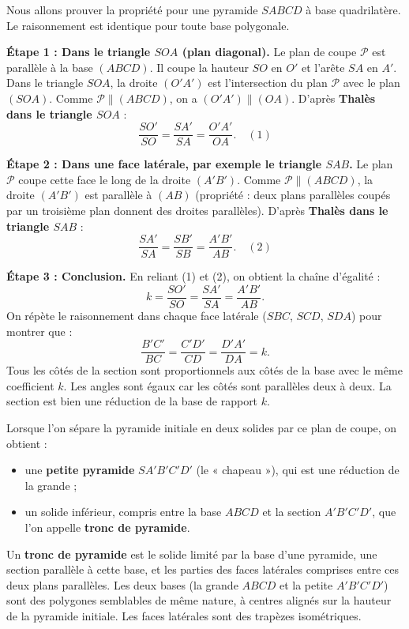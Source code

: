 \documentclass[11pt]{article}
\newcounter{popsec}
\newcounter{popsub}
\newcommand{\courssub}[1]{%
  \stepcounter{popsub}%
  \par\vspace{9pt}\noindent{\popxbold\fontsize{11.5}{13}\selectfont\color{popink}{\color{poporange}\thepopsec.\thepopsub}\hspace{6pt}#1}\par\nopagebreak\vspace{4pt}
}
\begin{document}
\begin{experience}
Nous allons prouver la propriété pour une pyramide $SABCD$ à base quadrilatère. Le raisonnement est identique pour toute base polygonale.

\textbf{Étape 1 : Dans le triangle $SOA$ (plan diagonal).}
Le plan de coupe $\mathcal{P}$ est parallèle à la base $(ABCD)$. Il coupe la hauteur $SO$ en $O'$ et l'arête $SA$ en $A'$.
Dans le triangle $SOA$, la droite $(O'A')$ est l'intersection du plan $\mathcal{P}$ avec le plan $(SOA)$. Comme $\mathcal{P} \parallel (ABCD)$, on a $(O'A') \parallel (OA)$.
D'après \textbf{Thalès dans le triangle $SOA$} :
\[
\frac{SO'}{SO} = \frac{SA'}{SA} = \frac{O'A'}{OA}. \quad (1)
\]

\textbf{Étape 2 : Dans une face latérale, par exemple le triangle $SAB$.}
Le plan $\mathcal{P}$ coupe cette face le long de la droite $(A'B')$. Comme $\mathcal{P} \parallel (ABCD)$, la droite $(A'B')$ est parallèle à $(AB)$ (propriété : deux plans parallèles coupés par un troisième plan donnent des droites parallèles).
D'après \textbf{Thalès dans le triangle $SAB$} :
\[
\frac{SA'}{SA} = \frac{SB'}{SB} = \frac{A'B'}{AB}. \quad (2)
\]

\textbf{Étape 3 : Conclusion.}
En reliant (1) et (2), on obtient la chaîne d'égalité :
\[
k = \frac{SO'}{SO} = \frac{SA'}{SA} = \frac{A'B'}{AB}.
\]
On répète le raisonnement dans chaque face latérale ($SBC$, $SCD$, $SDA$) pour montrer que :
\[
\frac{B'C'}{BC} = \frac{C'D'}{CD} = \frac{D'A'}{DA} = k.
\]
Tous les côtés de la section sont proportionnels aux côtés de la base avec le même coefficient $k$. Les angles sont égaux car les côtés sont parallèles deux à deux. La section est bien une réduction de la base de rapport $k$.
\end{experience}

\courssub{Le tronc de pyramide}

Lorsque l'on sépare la pyramide initiale en deux solides par ce plan de coupe, on obtient :
\begin{itemize}
    \item une \textbf{petite pyramide} $SA'B'C'D'$ (le « chapeau »), qui est une réduction de la grande ;
    \item un solide inférieur, compris entre la base $ABCD$ et la section $A'B'C'D'$, que l'on appelle \textbf{tronc de pyramide}.
\end{itemize}

\begin{definition}
Un \textbf{tronc de pyramide} est le solide limité par la base d'une pyramide, une section parallèle à cette base, et les parties des faces latérales comprises entre ces deux plans parallèles.
Les deux bases (la grande $ABCD$ et la petite $A'B'C'D'$) sont des polygones semblables de même nature, à centres alignés sur la hauteur de la pyramide initiale. Les faces latérales sont des trapèzes isométriques.
\end{definition}
\end{document}
